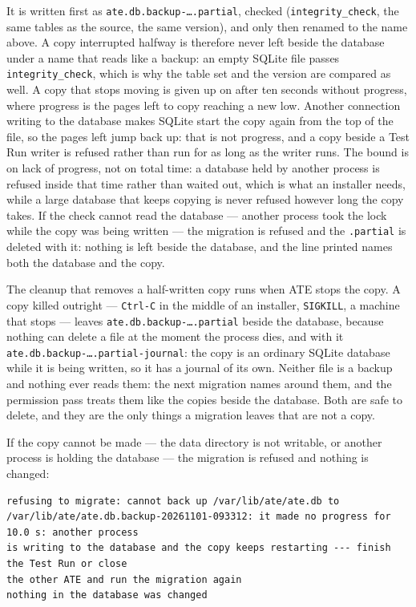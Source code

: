 It is written first as \texttt{ate.db.backup-\dots.partial}, checked (\texttt{integrity\_\allowbreak{}check},
the same tables as the source, the same version), and only then renamed to the name above. A copy
interrupted halfway is therefore never left beside the database under a name that reads like a
backup: an empty SQLite file passes \texttt{integrity\_\allowbreak{}check}, which is why the table set and the
version are compared as well. A copy that stops moving is given up on after ten seconds without
progress, where progress is the pages left to copy reaching a new low. Another connection writing to
the database makes SQLite start the copy again from the top of the file, so the pages left jump back
up: that is not progress, and a copy beside a Test Run writer is refused rather than run for as long
as the writer runs. The bound is on lack of progress, not on total time: a database held by another
process is refused inside that time rather than waited out, which is what an installer needs, while a
large database that keeps copying is never refused however long the copy takes. If the check
cannot read the database --- another process took the lock while the copy was being written --- the
migration is refused and the \texttt{.partial} is deleted with it: nothing is left beside the
database, and the line printed names both the database and the copy.

The cleanup that removes a half-written copy runs when ATE stops the copy. A copy killed outright
--- \texttt{Ctrl-C} in the middle of an installer, \texttt{SIGKILL}, a machine that stops --- leaves
\texttt{ate.db.backup-\dots.partial} beside the database, because nothing can delete a file at the
moment the process dies, and with it
\texttt{ate.db.backup-\dots.partial-journal}: the copy is an ordinary SQLite database while it is
being written, so it has a journal of its own. Neither file is a backup and nothing ever reads them:
the next migration names around them, and the permission pass treats them like the copies beside the
database. Both are safe to delete, and they are the only things a migration leaves that are not a
copy.

If the copy cannot be made --- the data directory is not writable, or another process is holding
the database --- the migration is refused and nothing is changed:

\begin{lstlisting}[language=ATEShell]
refusing to migrate: cannot back up /var/lib/ate/ate.db to
/var/lib/ate/ate.db.backup-20261101-093312: it made no progress for 10.0 s: another process
is writing to the database and the copy keeps restarting --- finish the Test Run or close
the other ATE and run the migration again
nothing in the database was changed
\end{lstlisting}

